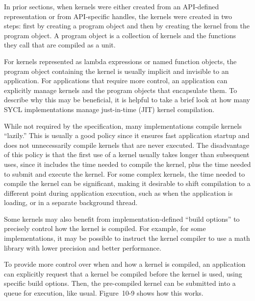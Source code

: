 In prior sections, when kernels were either created from an API-defined representation or from API-specific handles, the kernels were created in two steps: first by creating a program object and then by creating the kernel from the program object. A program object is a collection of kernels and the functions they call that are compiled as a unit.\par

For kernels represented as lambda expressions or named function objects, the program object containing the kernel is usually implicit and invisible to an application. For applications that require more control, an application can explicitly manage kernels and the program objects that encapsulate them. To describe why this may be beneficial, it is helpful to take a brief look at how many SYCL implementations manage just-in-time (JIT) kernel compilation.\par

While not required by the specification, many implementations compile kernels “lazily.” This is usually a good policy since it ensures fast application startup and does not unnecessarily compile kernels that are never executed. The disadvantage of this policy is that the first use of a kernel usually takes longer than subsequent uses, since it includes the time needed to compile the kernel, plus the time needed to submit and execute the kernel. For some complex kernels, the time needed to compile the kernel can be significant, making it desirable to shift compilation to a different point during application execution, such as when the application is loading, or in a separate background thread.\par

Some kernels may also benefit from implementation-defined “build options” to precisely control how the kernel is compiled. For example, for some implementations, it may be possible to instruct the kernel compiler to use a math library with lower precision and better performance.\par

To provide more control over when and how a kernel is compiled, an 
application can explicitly request that a kernel be compiled before the kernel is used, using specific build options. Then, the pre-compiled kernel can be submitted into a queue for execution, like usual. Figure 10-9 shows how this works.\par

